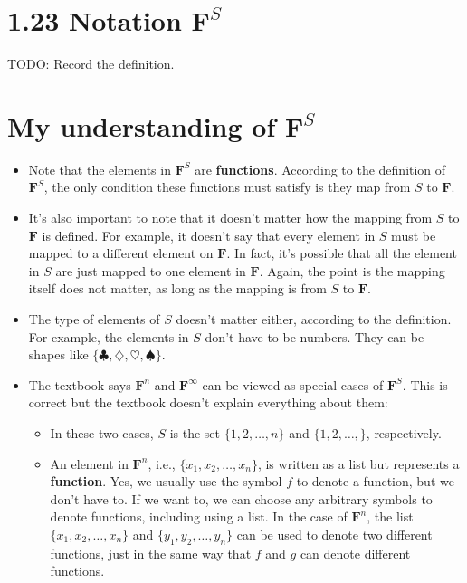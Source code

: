 \documentclass[12pt, letterpaper, oneside]{book}
\begin{document}
\section*{1.23 Notation $\mathbf{F}^S$}

TODO: Record the definition.

\section*{My understanding of $\mathbf{F}^S$}

\begin{itemize}
  \item Note that the elements in $\mathbf{F}^S$ are \textbf{functions}.
    According to the definition of $\mathbf{F}^S$, the only condition these
    functions must satisfy is they map from $S$ to $\mathbf{F}$.
  \item It's also important to note that it doesn't matter how the mapping from
    $S$ to $\mathbf{F}$ is defined. For example, it doesn't say that every
    element in $S$ must be mapped to a different element on $\mathbf{F}$. In
    fact, it's possible that all the element in $S$ are just mapped to one
    element in $\mathbf{F}$. Again, the point is the mapping itself does not
    matter, as long as the mapping is from $S$ to $\mathbf{F}$.
  \item The type of elements of $S$ doesn't matter either, according to the
    definition. For example, the elements in $S$ don't have to be numbers. They
    can be shapes like $\{ \clubsuit, \diamondsuit, \heartsuit, \spadesuit \}$.
  \item The textbook says $\mathbf{F}^n$ and $\mathbf{F}^{\infty}$ can be
    viewed as special cases of $\mathbf{F}^S$. This is correct but the textbook
    doesn't explain everything about them:
    \begin{itemize}
      \item In these two cases, $S$ is the set $\{ 1, 2, \ldots, n \}$ and
      $\{ 1, 2, \ldots, \}$, respectively.
      \item An element in $\mathbf{F}^n$, i.e., $\{ x_1, x_2, \ldots, x_n \}$,
        is written as a list but represents a \textbf{function}. Yes, we
        usually use the symbol $f$ to denote a function, but we don't have to.
        If we want to, we can choose any arbitrary symbols to denote functions,
        including using a list. In the case of $\mathbf{F}^n$, the list
        $\{ x_1, x_2, \ldots, x_n \}$ and $\{ y_1, y_2, \ldots, y_n \}$ can be
        used to denote two different functions, just in the same way that $f$
        and $g$ can denote different functions.
    \end{itemize}
\end{itemize}
\end{document}
